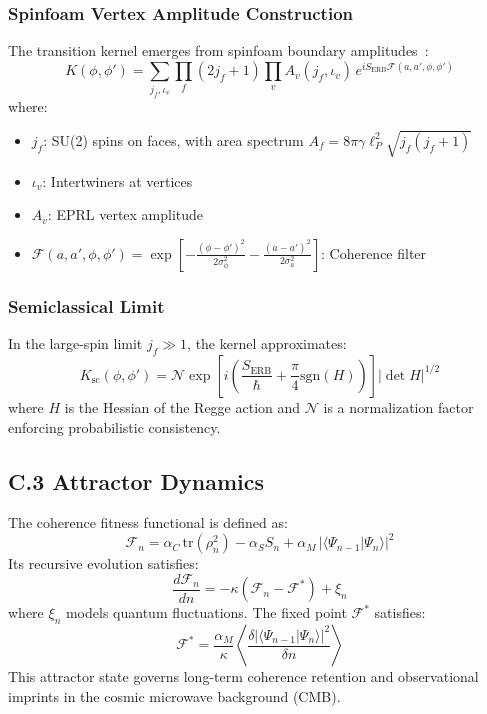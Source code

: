 \subsubsection*{Spinfoam Vertex Amplitude Construction}
The transition kernel emerges from spinfoam boundary amplitudes~\cite{rovelli2004quantum}:
\begin{equation}
K(\phi,\phi') = \sum_{j_f,\iota_v} \prod_f (2j_f+1) \prod_v A_v(j_f,\iota_v) \, e^{i S_{\text{ERB}} \mathcal{F}(a,a',\phi,\phi')}
\end{equation}
where:
\begin{itemize}
  \item $j_f$: SU(2) spins on faces, with area spectrum $A_f = 8\pi\gamma\ell_P^2\sqrt{j_f(j_f+1)}$
  \item $\iota_v$: Intertwiners at vertices
  \item $A_v$: EPRL vertex amplitude~\cite{engle2008lqg}
  \item $\mathcal{F}(a,a',\phi,\phi') = \exp\left[-\frac{(\phi - \phi')^2}{2\sigma_\phi^2} - \frac{(a - a')^2}{2\sigma_a^2}\right]$: Coherence filter
\end{itemize}

\subsubsection*{Semiclassical Limit}
In the large-spin limit $j_f \gg 1$, the kernel approximates:
\begin{equation}
K_{\text{sc}}(\phi,\phi') = \mathcal{N} \exp\left[i\left(\frac{S_{\text{ERB}}}{\hbar} + \frac{\pi}{4}\text{sgn}(H)\right)\right] |\det H|^{1/2}
\end{equation}
where $H$ is the Hessian of the Regge action and $\mathcal{N}$ is a normalization factor enforcing probabilistic consistency.

\subsection*{C.3 Attractor Dynamics}

The coherence fitness functional is defined as:
\begin{equation}
\mathcal{F}_n = \alpha_C \, \text{tr}(\rho_n^2) - \alpha_S S_n + \alpha_M \, |\langle \Psi_{n-1}|\Psi_n\rangle|^2
\end{equation}
Its recursive evolution satisfies:
\begin{equation}
\frac{d\mathcal{F}_n}{dn} = -\kappa(\mathcal{F}_n - \mathcal{F}^*) + \xi_n
\end{equation}
where $\xi_n$ models quantum fluctuations. The fixed point $\mathcal{F}^*$ satisfies:
\begin{equation}
\mathcal{F}^* = \frac{\alpha_M}{\kappa} \left\langle \frac{\delta|\langle\Psi_{n-1}|\Psi_n\rangle|^2}{\delta n} \right\rangle
\end{equation}
This attractor state governs long-term coherence retention and observational imprints in the cosmic microwave background (CMB).

